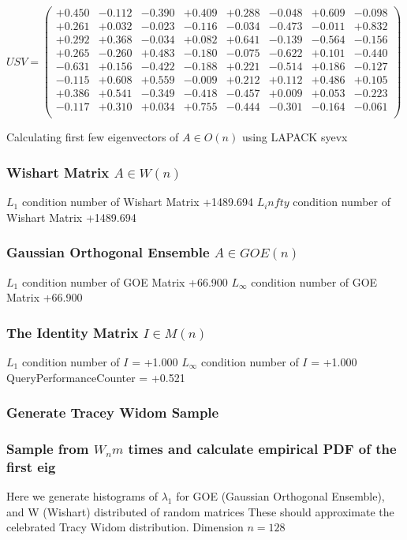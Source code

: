 \documentclass[9pt]{article}
\theoremstyle{plain}
\theoremstyle{definition}
\theoremstyle{remark}
\numberwithin{equation}{section}
\begin{document}
$U S V = \left(
\begin{array}{
cccccccc}
+0.450 & -0.112 & -0.390 & +0.409 & +0.288 & -0.048 & +0.609 & -0.098 \\
+0.261 & +0.032 & -0.023 & -0.116 & -0.034 & -0.473 & -0.011 & +0.832 \\
+0.292 & +0.368 & -0.034 & +0.082 & +0.641 & -0.139 & -0.564 & -0.156 \\
+0.265 & -0.260 & +0.483 & -0.180 & -0.075 & -0.622 & +0.101 & -0.440 \\
-0.631 & +0.156 & -0.422 & -0.188 & +0.221 & -0.514 & +0.186 & -0.127 \\
-0.115 & +0.608 & +0.559 & -0.009 & +0.212 & +0.112 & +0.486 & +0.105 \\
+0.386 & +0.541 & -0.349 & -0.418 & -0.457 & +0.009 & +0.053 & -0.223 \\
-0.117 & +0.310 & +0.034 & +0.755 & -0.444 & -0.301 & -0.164 & -0.061 \\
\end{array}
\right)$ \newline 

Calculating first few eigenvectors of $A \in O(n)$ using LAPACK syevx

\subsubsection{Wishart Matrix $A \in W(n)$}
$L_1$ condition number of Wishart Matrix +1489.694
$L_infty$ condition number of Wishart Matrix +1489.694
\subsubsection{Gaussian Orthogonal Ensemble $A \in GOE(n)$}
$L_1$ condition number of GOE Matrix +66.900
$L_\infty$ condition number of GOE Matrix +66.900
\subsubsection{The Identity Matrix $I \in M(n)$}
$L_1$ condition number of $I$ = +1.000
$L_\infty$ condition number of $I$ = +1.000
QueryPerformanceCounter  =  +0.521
\subsubsection{Generate Tracey Widom Sample}
\subsubsection{Sample from $W_n m$ times and calculate empirical PDF of the first eig}
Here we generate histograms of $\lambda_1$ for GOE (Gaussian Orthogonal Ensemble), and W (Wishart) 		 distributed of random matrices
These should approximate the celebrated Tracy Widom distribution.
Dimension $n = 128$
\end{document}
